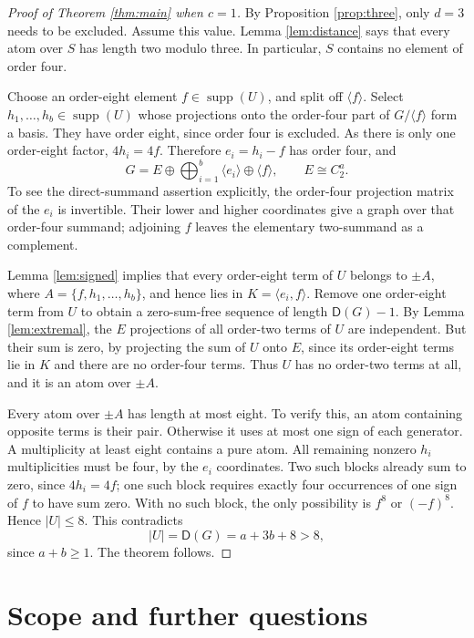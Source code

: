 \documentclass[11pt]{article}
\theoremstyle{definition}
\newcommand{\D}{\mathsf D}
\newcommand{\supp}{\operatorname{supp}}
\begin{document}
\begin{proof}[Proof of Theorem \ref{thm:main} when $c=1$]
By Proposition \ref{prop:three}, only $d=3$ needs to be excluded. Assume this value. Lemma \ref{lem:distance} says that every atom over $S$ has length two modulo three. In particular, $S$ contains no element of order four.

Choose an order-eight element $f\in\supp(U)$, and split off $\langle f\rangle$. Select $h_1,\ldots,h_b\in\supp(U)$ whose projections onto the order-four part of $G/\langle f\rangle$ form a basis. They have order eight, since order four is excluded. As there is only one order-eight factor, $4h_i=4f$. Therefore $e_i=h_i-f$ has order four, and
\[
 G=E\oplus\bigoplus_{i=1}^b\langle e_i\rangle\oplus\langle f\rangle,
 \qquad E\cong C_2^a.
\]
To see the direct-summand assertion explicitly, the order-four projection matrix of the $e_i$ is invertible. Their lower and higher coordinates give a graph over that order-four summand; adjoining $f$ leaves the elementary two-summand as a complement.

Lemma \ref{lem:signed} implies that every order-eight term of $U$ belongs to $\pm A$, where $A=\{f,h_1,\ldots,h_b\}$, and hence lies in $K=\langle e_i,f\rangle$. Remove one order-eight term from $U$ to obtain a zero-sum-free sequence of length $\D(G)-1$. By Lemma \ref{lem:extremal}, the $E$ projections of all order-two terms of $U$ are independent. But their sum is zero, by projecting the sum of $U$ onto $E$, since its order-eight terms lie in $K$ and there are no order-four terms. Thus $U$ has no order-two terms at all, and it is an atom over $\pm A$.

Every atom over $\pm A$ has length at most eight. To verify this, an atom containing opposite terms is their pair. Otherwise it uses at most one sign of each generator. A multiplicity at least eight contains a pure atom. All remaining nonzero $h_i$ multiplicities must be four, by the $e_i$ coordinates. Two such blocks already sum to zero, since $4h_i=4f$; one such block requires exactly four occurrences of one sign of $f$ to have sum zero. With no such block, the only possibility is $f^8$ or $(-f)^8$. Hence $|U|\leq8$. This contradicts
\[
 |U|=\D(G)=a+3b+8>8,
\]
since $a+b\geq1$. The theorem follows.
\end{proof}

\section{Scope and further questions}
\end{document}
